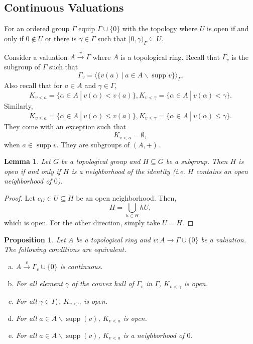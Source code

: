 \documentclass[8pt]{article}
\numberwithin{equation}{section}
\newtheorem{proposition}{Proposition}[subsection]
\newtheorem{lemma}{Lemma}[subsection]
\DeclareMathOperator{\supp}{supp}
\newcommand{\sep}[0]{\:|\:}
\begin{document}
\subsection{Continuous Valuations}
For an ordered group $\Gamma$ equip $\Gamma\cup\{0\}$ with the topology where $U$ is open if and only if $0\not\in U$ or there is $\gamma\in\Gamma$ such that $[0,\gamma)_\Gamma\subseteq U$.
\par Consider a valuation $A\stackrel{v}{\to}\Gamma$ where $A$ is a topological ring. Recall that $\Gamma_v$ is the subgroup of $\Gamma$ such that
\begin{equation*}
    \Gamma_v = \langle\{v(a)\sep a\in A\backslash\supp v\}\rangle_\Gamma.
\end{equation*}
Also recall that for $a\in A$ and $\gamma\in \Gamma$,
\begin{equation*}
    K_{v<a} = \{\alpha\in A\sep v(\alpha)<v(a)\},K_{v<\gamma} = \{\alpha\in A\sep v(\alpha)<\gamma\}.
\end{equation*}
Similarly,
\begin{equation*}
    K_{v\leq a} = \{\alpha\in A\sep v(\alpha)\leq v(a)\},K_{v\leq\gamma} = \{\alpha\in A\sep v(\alpha)\leq\gamma\}.
\end{equation*}
They come with an exception such that 
\begin{equation*}
    K_{v<a}= \emptyset,
\end{equation*}
when $a\in\supp v$. They are subgroups of $(A,+)$. %
\begin{lemma}
    \label{lemma_fact_12_1}
    Let $G$ be a topological group and $H\subseteq G$ be a subgroup. Then $H$ is open if and only if $H$ is a neighborhood of the identity (i.e. $H$ contains an open neighborhood of $0$).
\end{lemma}
\begin{proof}
    Let $e_G\in U\subseteq H$ be an open neighborhood. Then,
    \begin{equation*}
        H = \bigcup_{h\in H}hU,
    \end{equation*}
    which is open. For the other direction, simply take $U=H$.
\end{proof}
\begin{proposition}
    \label{fact_12_1}
    Let $A$ be a topological ring and $v:A\to\Gamma\cup\{0\}$ be a valuation. The following conditions are equivalent.
    \begin{enumerate}[a.]
        \item $A\stackrel{v}{\to}\Gamma_v\cup\{0\}$ is continuous.
        \item For all element $\gamma$ of the convex hull of $\Gamma_v$ in $\Gamma$, $K_{v<\gamma}$ is open.
        \item For all $\gamma\in\Gamma_v$, $K_{v<\gamma}$ is open.
        \item For all $a\in A\backslash\supp(v)$, $K_{v<a}$ is open.
        \item For all $a\in A\backslash\supp(v)$, $K_{v<a}$ is a neighborhood of $0$.
    \end{enumerate}
\end{proposition}
\end{document}
